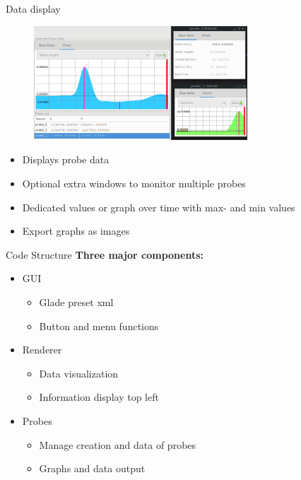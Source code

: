 \documentclass[shortpres,usenames,dvipsnames]{beamer}
\begin{document}
\begin{frame}[fragile]{Data display}
	\begin{figure}
		\includegraphics[clip, width=80mm]{img/datadisplay.png}
	\end{figure}
	\begin{itemize}
		\item Displays probe data
		\item Optional extra windows to monitor multiple probes
		\item Dedicated values or graph over time with max- and min values
		\item Export graphs as images 
	\end{itemize}
\end{frame}


\begin{frame}[fragile]{Code Structure}
\textbf{Three major components:}\\
\begin{itemize}
		\item GUI
			\begin{itemize}
			\item Glade preset xml
			\item Button and menu functions
			\end{itemize}
		\item Renderer
			\begin{itemize}
			\item Data visualization
			\item Information display top left
			\end{itemize}
		\item Probes
			\begin{itemize}
			\item Manage creation and data of probes
			\item Graphs and data output
			\end{itemize}
	\end{itemize}
\end{frame}
\end{document}
